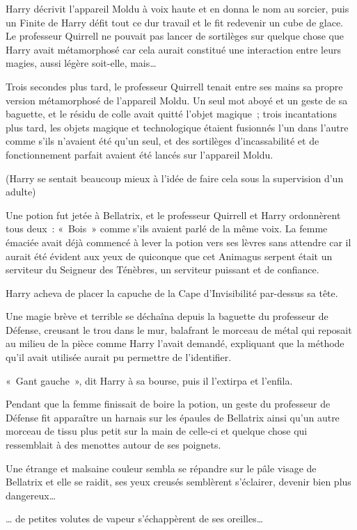 Harry décrivit l'appareil Moldu à voix haute et en donna le nom au sorcier, puis un Finite de Harry défit tout ce dur travail et le fit redevenir un cube de glace. Le professeur Quirrell ne pouvait pas lancer de sortilèges sur quelque chose que Harry avait métamorphosé car cela aurait constitué une interaction entre leurs magies, aussi légère soit-elle, mais…

Trois secondes plus tard, le professeur Quirrell tenait entre ses mains sa propre version métamorphosé de l'appareil Moldu. Un seul mot aboyé et un geste de sa baguette, et le résidu de colle avait quitté l'objet magique~; trois incantations plus tard, les objets magique et technologique étaient fusionnés l'un dans l'autre comme s'ils n'avaient été qu'un seul, et des sortilèges d'incassabilité et de fonctionnement parfait avaient été lancés sur l'appareil Moldu.

(Harry se sentait beaucoup mieux à l'idée de faire cela sous la supervision d'un adulte)

Une potion fut jetée à Bellatrix, et le professeur Quirrell et Harry ordonnèrent tous deux~: «~Bois~» comme s'ils avaient parlé de la même voix. La femme émaciée avait déjà commencé à lever la potion vers ses lèvres sans attendre car il aurait été évident aux yeux de quiconque que cet Animagus serpent était un serviteur du Seigneur des Ténèbres, un serviteur puissant et de confiance.

Harry acheva de placer la capuche de la Cape d'Invisibilité par-dessus sa tête.

Une magie brève et terrible se déchaîna depuis la baguette du professeur de Défense, creusant le trou dans le mur, balafrant le morceau de métal qui reposait au milieu de la pièce comme Harry l'avait demandé, expliquant que la méthode qu'il avait utilisée aurait pu permettre de l'identifier.

«~Gant gauche~», dit Harry à sa bourse, puis il l'extirpa et l'enfila.

Pendant que la femme finissait de boire la potion, un geste du professeur de Défense fit apparaître un harnais sur les épaules de Bellatrix ainsi qu'un autre morceau de tissu plus petit sur la main de celle-ci et quelque chose qui ressemblait à des menottes autour de ses poignets.

Une étrange et malsaine couleur sembla se répandre sur le pâle visage de Bellatrix et elle se raidit, ses yeux creusés semblèrent s'éclairer, devenir bien plus dangereux…

… de petites volutes de vapeur s'échappèrent de ses oreilles…

